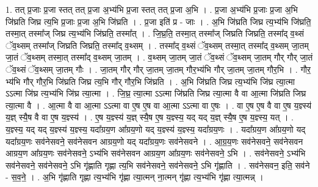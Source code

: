 \documentclass[17pt]{extarticle}
\begin{document}
1. तत् प्र॒जाः प्र॒जा स्तत् तत् प्र॒जा अ॒भ्य॑भि प्र॒जा स्तत् तत् प्र॒जा अ॒भि । . प्र॒जा अ॒भ्य॑भि प्र॒जाः प्र॒जा अ॒भि जि॑घ्रति जिघ्र त्य॒भि प्र॒जाः प्र॒जा अ॒भि जि॑घ्रति । . प्र॒जा इति॑ प्र - जाः । . अ॒भि जि॑घ्रति जिघ्र त्य॒भ्य॑भि जि॑घ्रति॒ तस्मा॒त् तस्मा᳚ज् जिघ्र त्य॒भ्य॑भि जि॑घ्रति॒ तस्मा᳚त् । . जि॒घ्र॒ति॒ तस्मा॒त् तस्मा᳚ज् जिघ्रति जिघ्रति॒ तस्मा᳚द् व॒थ्सं ॅव॒थ्सम् तस्मा᳚ज् जिघ्रति जिघ्रति॒ तस्मा᳚द् व॒थ्सम् । . तस्मा᳚द् व॒थ्सं ॅव॒थ्सम् तस्मा॒त् तस्मा᳚द् व॒थ्सम् जा॒तम् जा॒तं ॅव॒थ्सम् तस्मा॒त् तस्मा᳚द् व॒थ्सम् जा॒तम् । . व॒थ्सम् जा॒तम् जा॒तं ॅव॒थ्सं ॅव॒थ्सम् जा॒तम् गौर् गौर् जा॒तं ॅव॒थ्सं ॅव॒थ्सम् जा॒तम् गौः । . जा॒तम् गौर् गौर् जा॒तम् जा॒तम् गौर॒भ्य॑भि गौर् जा॒तम् जा॒तम् गौर॒भि । . गौर॒ भ्य॑भि गौर् गौर॒भि जि॑घ्रति जिघ्र त्य॒भि गौर् गौर॒भि जि॑घ्रति । . अ॒भि जि॑घ्रति जिघ्र त्य॒भ्य॑भि जि॑घ्र त्या॒त्मा ऽऽत्मा जि॑घ्र त्य॒भ्य॑भि जि॑घ्र त्या॒त्मा । . जि॒घ्र॒ त्या॒त्मा ऽऽत्मा जि॑घ्रति जिघ्र त्या॒त्मा वै वा आ॒त्मा जि॑घ्रति जिघ्र त्या॒त्मा वै । . आ॒त्मा वै वा आ॒त्मा ऽऽत्मा वा ए॒ष ए॒ष वा आ॒त्मा ऽऽत्मा वा ए॒षः । . वा ए॒ष ए॒ष वै वा ए॒ष य॒ज्ञ्स्य॑ य॒ज्ञ् स्यै॒ष वै वा ए॒ष य॒ज्ञ्स्य॑ । . ए॒ष य॒ज्ञ्स्य॑ य॒ज्ञ् स्यै॒ष ए॒ष य॒ज्ञ्स्य॒ यद् यद् य॒ज्ञ् स्यै॒ष ए॒ष य॒ज्ञ्स्य॒ यत् । . य॒ज्ञ्स्य॒ यद् यद् य॒ज्ञ्स्य॑ य॒ज्ञ्स्य॒ यदा᳚ग्रय॒ण आ᳚ग्रय॒णो यद् य॒ज्ञ्स्य॑ य॒ज्ञ्स्य॒ यदा᳚ग्रय॒णः । . यदा᳚ग्रय॒ण आ᳚ग्रय॒णो यद् यदा᳚ग्रय॒णः सव॑नेसवने॒ सव॑नेसवन आग्रय॒णो यद् यदा᳚ग्रय॒णः सव॑नेसवने । . आ॒ग्र॒य॒णः सव॑नेसवने॒ सव॑नेसवन आग्रय॒ण आ᳚ग्रय॒णः सव॑नेसवने॒ ऽभ्य॑भि सव॑नेसवन आग्रय॒ण आ᳚ग्रय॒णः सव॑नेसवने॒ ऽभि । . सव॑नेसवने॒ ऽभ्य॑भि सव॑नेसवने॒ सव॑नेसवने॒ ऽभि गृ॑ह्णाति गृह्णा त्य॒भि सव॑नेसवने॒ सव॑नेसवने॒ ऽभि गृ॑ह्णाति । . सव॑नेसवन॒ इति॒ सव॑ने - स॒व॒ने॒ । . अ॒भि गृ॑ह्णाति गृह्णा त्य॒भ्य॑भि गृ॑ह्णा त्या॒त्मन् ना॒त्मन् गृ॑ह्णा त्य॒भ्य॑भि गृ॑ह्णा त्या॒त्मन्न् । \newline
\end{document}
